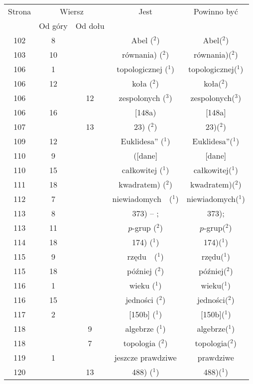 \documentclass[a4paper,11pt]{article}
\numberwithin{equation}{section}
\begin{document}
\begin{center}
  \begin{tabular}{|c|c|c|c|c|}
    \hline
    Strona & \multicolumn{2}{c|}{Wiersz} & Jest
                              & Powinno być \\ \cline{2-3}
    & Od góry & Od dołu & & \\
    \hline
    102 &  8 & & Abel ($^{ 2 }$) & Abel($^{ 2 }$) \\
    103 & 10 & & równania) ($^{ 2 }$) & równania)($^{ 2 }$) \\
    106 &  1 & & topologicznej ($^{ 1 }$) & topologicznej($^{ 1 }$) \\
    106 & 12 & & koła ($^{ 2 }$) & koła($^{ 2 }$) \\
    106 & & 12 & zespolonych ($^{ 3 }$) & zespolonych($^{ 3 }$) \\
    106 & 16 & & [148a) & [148a] \\
    107 & & 13 & 23) ($^{ 2 }$) & 23)($^{ 2 }$) \\
    109 & 12 & & Euklidesa” ($^{ 1 }$) & Euklidesa”($^{ 1 }$) \\
    110 &  9 & & ([dane] & [dane] \\
    110 & 15 & & całkowitej ($^{ 1 }$) & całkowitej($^{ 1 }$) \\
    111 & 18 & & kwadratem) ($^{ 2 }$) & kwadratem)($^{ 2 }$) \\
    112 &  7 & & niewiadomych~~($^{ 1 }$) & niewiadomych($^{ 1 }$) \\
    113 &  8 & & 373) -- ; & 373); \\
    113 & 11 & & $p$-grup ($^{ 2 }$) & $p$-grup($^{ 2 }$) \\
    114 & 18 & & 174) ($^{ 1 }$) & 174)($^{ 1 }$) \\
    115 &  9 & & rzędu~~($^{ 1 }$) & rzędu($^{ 1 }$) \\
    115 & 18 & & później ($^{ 2 }$) & później($^{ 2 }$) \\
    116 &  1 & & wieku ($^{ 1 }$) & wieku($^{ 1 }$) \\
    116 & 15 & & jedności ($^{ 2 }$) & jedności($^{ 2 }$) \\
    117 &  2 & & [150b] ($^{ 1 }$) & [150b]($^{ 1 }$) \\
    118 & &  9 & algebrze ($^{ 1 }$) & algebrze($^{ 1 }$) \\
    118 & &  7 & topologia ($^{ 2 }$) & topologia($^{ 2 }$) \\
    119 &  1 & & jeszcze prawdziwe & prawdziwe \\
    120 & & 13 & 488) ($^{ 1 }$) & 488)($^{ 1 }$) \\

\end{tabular}
\end{center}
\end{document}
